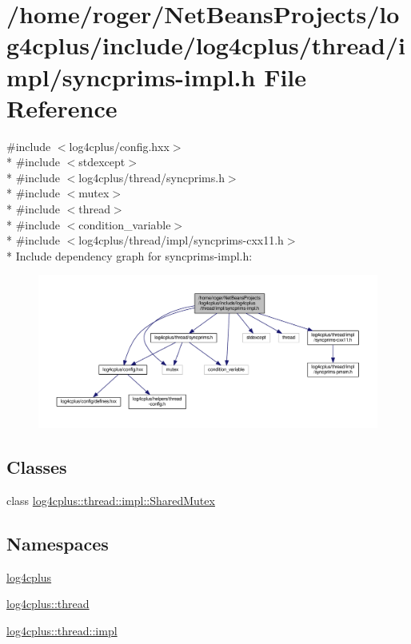 \hypertarget{syncprims-impl_8h}{\section{/home/roger/\-Net\-Beans\-Projects/log4cplus/include/log4cplus/thread/impl/syncprims-\/impl.h File Reference}
\label{syncprims-impl_8h}
}
{\ttfamily \#include $<$log4cplus/config.\-hxx$>$}\\*
{\ttfamily \#include $<$stdexcept$>$}\\*
{\ttfamily \#include $<$log4cplus/thread/syncprims.\-h$>$}\\*
{\ttfamily \#include $<$mutex$>$}\\*
{\ttfamily \#include $<$thread$>$}\\*
{\ttfamily \#include $<$condition\-\_\-variable$>$}\\*
{\ttfamily \#include $<$log4cplus/thread/impl/syncprims-\/cxx11.\-h$>$}\\*
Include dependency graph for syncprims-\/impl.h\-:
\nopagebreak
\begin{figure}[H]
\begin{center}
\leavevmode
\includegraphics[width=350pt]{syncprims-impl_8h__incl}
\end{center}
\end{figure}
\subsection*{Classes}
\begin{DoxyCompactItemize}
\item 
class \hyperlink{classlog4cplus_1_1thread_1_1impl_1_1SharedMutex}{log4cplus\-::thread\-::impl\-::\-Shared\-Mutex}
\end{DoxyCompactItemize}
\subsection*{Namespaces}
\begin{DoxyCompactItemize}
\item 
\hyperlink{namespacelog4cplus}{log4cplus}
\item 
\hyperlink{namespacelog4cplus_1_1thread}{log4cplus\-::thread}
\item 
\hyperlink{namespacelog4cplus_1_1thread_1_1impl}{log4cplus\-::thread\-::impl}
\end{DoxyCompactItemize}
